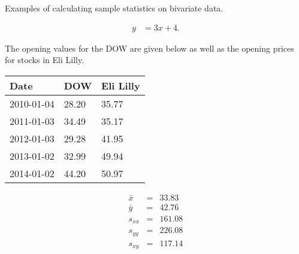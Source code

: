 


\begin{problem}
\item Examples of calculating sample statistics on bivariate data.

  \begin{subproblem}
  \item 
    \begin{eqnarray}
      y & = 3x + 4.
    \end{eqnarray}
    \vfill
  \end{subproblem}


\end{problem}





The opening values for the DOW are given below as well as the opening
prices for stocks in Eli Lilly.

\begin{multicols}{2}
  \begin{tabular}{l|l|l}
    Date & DOW & Eli Lilly \\ \hline
    2010-01-04 & 28.20 & 35.77 \\
    2011-01-03 & 34.49 & 35.17 \\
    2012-01-03 & 29.28 & 41.95 \\
    2013-01-02 & 32.99 & 49.94 \\
    2014-01-02 & 44.20 & 50.97
  \end{tabular}
  \columnbreak
  \begin{eqnarray*}
    \bar{x} & = & 33.83 \\
    \bar{y} & = & 42.76 \\
    s_{xx}  & = & 161.08 \\
    s_{yy}  & = & 226.08 \\
    s_{xy}  & = & 117.14
  \end{eqnarray*}
\end{multicols}

